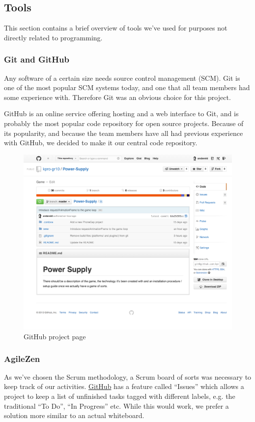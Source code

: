 \subsection{Tools}

This section contains a brief overview of tools we've used for purposes not
directly related to programming.

\subsubsection{Git and GitHub}
Any software of a certain size needs source control management (SCM). Git is
one of the most popular SCM systems today, and one that all team members had
some experience with. Therefore Git was an obvious choice for this project.

GitHub is an online service offering hosting and a web interface to Git, and is
probably the most popular code repository for open source projects. Because of
its popularity, and because the team members have all had previous experience
with GitHub, we decided to make it our central code repository.

\begin{figure}[htb]
  \centering
  \includegraphics[width=1\textwidth]{pictures/github.png}
  \caption{GitHub project page}
\end{figure}

\subsubsection{AgileZen}
As we've chosen the Scrum methodology, a Scrum board of sorts was necessary to
keep track of our activities. \href{https://github.com}{GitHub} has a
feature called ``Issues'' which allows a project to keep a list of unfinished
tasks tagged with different labels, e.g. the traditional ``To Do'', ``In
Progress'' etc. While this would work, we prefer a solution more similar to an
actual whiteboard.

